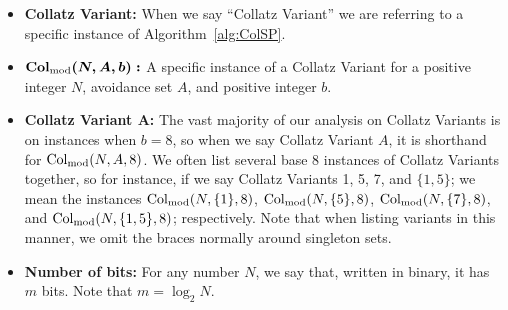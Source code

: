 \begin{itemize}
    \item \textbf{Collatz Variant:} When we say ``Collatz Variant'' we are referring to a specific instance of Algorithm~\ref{alg:ColSP}.
    \item $\boldsymbol{\mathrm{Col}_{\text{mod}}(N,A,b):}$ A specific instance of a Collatz Variant for a positive integer $N$, avoidance set $A$, and positive integer $b$. 
    \item \textbf{Collatz Variant A:} The vast majority of our analysis on Collatz Variants is on instances when $b = 8$, so when we say Collatz Variant $A$, it is shorthand for $\mathrm{Col}_{\text{mod}}(N,A,8)$. We often list several base 8 instances of Collatz Variants together, so for instance, if we say Collatz Variants 1, 5, 7, and $\{1,5\}$; we mean the instances $\mathrm{Col}_{\text{mod}}(N,\{1\},8)$, $\mathrm{Col}_{\text{mod}}(N,\{5\},8)$, $\mathrm{Col}_{\text{mod}}(N,\{7\},8)$, and $\mathrm{Col}_{\text{mod}}(N,\{1,5\},8)$; respectively. Note that when listing variants in this manner, we omit the braces normally around singleton sets.
\item \textbf{Number of bits:} For any number $N$, we say that, written in binary, it has $m$ bits. Note that $m = \log_2{N}$.
\end{itemize}
